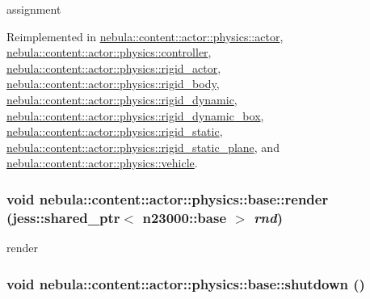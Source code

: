 assignment 

Reimplemented in \hyperlink{classnebula_1_1content_1_1actor_1_1physics_1_1actor_abdcf4fcfdf017e71cea08a8c0341a4c8}{nebula::content::actor::physics::actor}, \hyperlink{classnebula_1_1content_1_1actor_1_1physics_1_1controller_a8ef51f82c285732fd3c5919c1019caa8}{nebula::content::actor::physics::controller}, \hyperlink{classnebula_1_1content_1_1actor_1_1physics_1_1rigid__actor_aa3d6e979793753e37b9b95b118e40c67}{nebula::content::actor::physics::rigid\_\-actor}, \hyperlink{classnebula_1_1content_1_1actor_1_1physics_1_1rigid__body_afeaa8197cacc9b3f9e2b618f0ee0443b}{nebula::content::actor::physics::rigid\_\-body}, \hyperlink{classnebula_1_1content_1_1actor_1_1physics_1_1rigid__dynamic_a115e82dbc90ce5ae9f8d41724f1bd44d}{nebula::content::actor::physics::rigid\_\-dynamic}, \hyperlink{classnebula_1_1content_1_1actor_1_1physics_1_1rigid__dynamic__box_a26c54eacc3d28dd0b88e7a67fe6635f7}{nebula::content::actor::physics::rigid\_\-dynamic\_\-box}, \hyperlink{classnebula_1_1content_1_1actor_1_1physics_1_1rigid__static_ae32ba52ca54bc1cc78572b931a98600d}{nebula::content::actor::physics::rigid\_\-static}, \hyperlink{classnebula_1_1content_1_1actor_1_1physics_1_1rigid__static__plane_a507d6d75754916f23d673205d53b3874}{nebula::content::actor::physics::rigid\_\-static\_\-plane}, and \hyperlink{classnebula_1_1content_1_1actor_1_1physics_1_1vehicle_a3f3cc0f6995d59a681f8a70a2969f148}{nebula::content::actor::physics::vehicle}.\hypertarget{classnebula_1_1content_1_1actor_1_1physics_1_1base_ad03b69e3d7ea25e9a5e93cd8000b799b}{
\subsubsection[{render}]{\setlength{\rightskip}{0pt plus 5cm}void nebula::content::actor::physics::base::render (jess::shared\_\-ptr$<$ {\bf n23000::base} $>$ {\em rnd})}}
\label{classnebula_1_1content_1_1actor_1_1physics_1_1base_ad03b69e3d7ea25e9a5e93cd8000b799b}


render \hypertarget{classnebula_1_1content_1_1actor_1_1physics_1_1base_a6de64e1ab1a4e3dd3274bfa722c7aed1}{
\subsubsection[{shutdown}]{\setlength{\rightskip}{0pt plus 5cm}void nebula::content::actor::physics::base::shutdown ()}}
\label{classnebula_1_1content_1_1actor_1_1physics_1_1base_a6de64e1ab1a4e3dd3274bfa722c7aed1}


